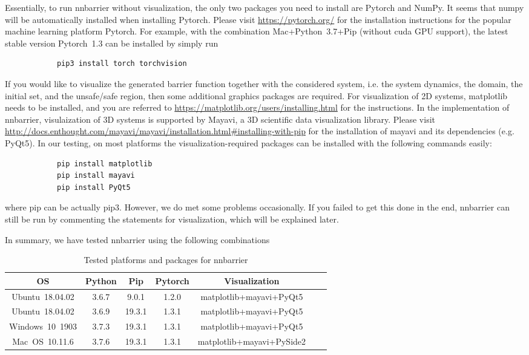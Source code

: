 \documentclass{llncs}
\begin{document}
Essentially, to run \textsf{nnbarrier} without visualization, the only two packages you need to install are \textsf{Pytorch} and \textsf{NumPy}.
It seems that \textsf{numpy} will be automatically installed when installing \textsf{Pytorch}. Please visit \url{https://pytorch.org/} for the 
installation instructions
for the popular machine learning platform \textsf{Pytorch}. For example, with the combination 
\textsf{Mac+Python~3.7+Pip} (without \textsf{cuda} GPU support), the latest stable version \textsf{Pytorch~1.3} can be installed by simply run 
\begin{verbatim}
            pip3 install torch torchvision\end{verbatim}

If you would like to visualize the generated barrier function together with the considered system, i.e. the system dynamics, the domain, the initial set, and the unsafe/safe region,
then some additional graphics packages are required. For visualization of 2D systems, \textsf{matplotlib} needs to be installed, and you are referred to
 \url{https://matplotlib.org/users/installing.html} for the instructions. In the implementation of \textsf{nnbarrier},
 visulaization of 3D systems is supported by \textsf{Mayavi}, a 3D scientific data visualization library. Please visit
 \url{http://docs.enthought.com/mayavi/mayavi/installation.html#installing-with-pip} for the installation of \textsf{mayavi} and 
 its dependencies (e.g. \textsf{PyQt5}). In our testing, on most platforms the visualization-required packages can be installed with the following commands easily:
\begin{verbatim}              
            pip install matplotlib
            pip install mayavi
            pip install PyQt5 \end{verbatim}
where \textsf{pip} can be actually \textsf{pip3}. However, we do met some problems occasionally. If you failed to
get this done in the end, \textsf{nnbarrier} can still be run by commenting the statements for visualization, which
will be explained later.  

In summary, we have tested \textsf{nnbarrier} using the following combinations
\begin{table}
    \centering
	\caption{Tested platforms and packages for \textsf{nnbarrier}}\label{tbl:platform}
	\begin{tabular}{|c|c|c|c|c|c|c|} 
		\hline OS                 & Python    & Pip      & Pytorch & Visualization \\ 
		\hline Ubuntu~18.04.02    & 3.6.7     & 9.0.1    & 1.2.0   & \textsf{matplotlib+mayavi+PyQt5}  \\ 
		\hline Ubuntu~18.04.02    & 3.6.9     & 19.3.1   & 1.3.1   & \textsf{matplotlib+mayavi+PyQt5}  \\ 
        \hline Windows~10~1903    & 3.7.3     & 19.3.1   & 1.3.1   & \textsf{matplotlib+mayavi+PyQt5}  \\
        \hline Mac~OS~10.11.6     & 3.7.6     & 19.3.1   & 1.3.1   & \textsf{matplotlib+mayavi+PySide2}  \\ 
		\hline
	\end{tabular}
\end{table}
\end{document}
